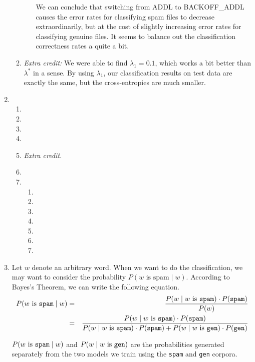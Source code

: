 \documentclass[11pt]{article}
\begin{document}
\begin{enumerate}
\begin{enumerate}[label=(\alph*)]
\begin{itemize}
				We can conclude that switching from ADDL to BACKOFF\_ADDL causes the error rates for classifying spam files to decrease extraordinarily, but at the cost of slightly increasing error rates for classifying genuine files. It seems to balance out the classification correctness rates a quite a bit.
		\end{itemize}
	\item %
		\textit{Extra credit:} We were able to find $\lambda_1 = 0.1$, which works a bit better than $\lambda^*$ in a sense. By using $\lambda_1$, our classification results on test data are exactly the same, but the cross-entropies are much smaller.
	\end{enumerate}
\item %
	\begin{enumerate}[label=(\alph*)]
	\item %
	\item %
	\item %
	\item %
	\item %
		\textit{Extra credit.}
	\item %
	\item %
		\begin{enumerate}[label=\roman*.]
		\item %
		\item %
		\item %
		\item %
		\item %
		\item %
		\item %
		\end{enumerate}
	\end{enumerate}
\item %
	Let $w$ denote an arbitrary word. When we want to do the classification, we may want to consider the probability $P(w \text{ is spam} \mid w)$. According to Bayes's Theorem, we can write the following equation.
	\begin{eqnarray*}
		P(w \text{ is \texttt{spam}} \mid w) &=& \frac{P(w \mid w \text{ is \texttt{spam}}) \cdot P(\texttt{spam})}{P(w)} \\
	               &=& \frac{P(w \mid w \text{ is \texttt{spam}}) \cdot P(\texttt{spam})}{P(w \mid w \text{ is \texttt{spam}}) \cdot P(\texttt{spam}) + P(w \mid w \text{ is \texttt{gen}}) \cdot P(\texttt{gen})}
	\end{eqnarray*}

	$P(w \text{ is \texttt{spam}} \mid w)$ and $P(w \mid w \text{ is \texttt{gen}})$ are the probabilities generated separately from the two models we train using the \texttt{spam} and \texttt{gen} corpora.


\end{enumerate}
\end{document}
